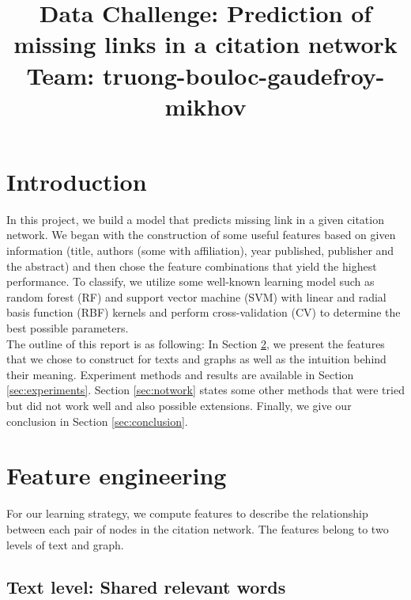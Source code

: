 \documentclass{article}
\title{Data Challenge: Prediction of missing links in a citation network\\Team: truong-bouloc-gaudefroy-mikhov}
\begin{document}
\ninept

\maketitle


\section{Introduction}

In this project, we build a model that predicts missing link in a given citation network. We began with the construction of some useful features based on given information (title, authors (some with affiliation), year published, publisher and the abstract) and then chose the feature combinations that yield the highest performance. To classify, we utilize some well-known learning model such as random forest (RF) and support vector machine (SVM) with linear and radial basis function (RBF) kernels and perform cross-validation (CV) to determine the best possible parameters.\\
The outline of this report is as following: In Section \ref{sec:feature}, we present the features that we chose to construct for texts and graphs as well as the intuition behind their meaning. Experiment methods and results are available in Section \ref{sec:experiments}. Section \ref{sec:notwork} states some other methods that were tried but did not work well and also possible extensions. Finally, we give our conclusion in Section \ref{sec:conclusion}.

\section{Feature engineering}
\label{sec:feature}

For our learning strategy, we compute features to describe the relationship between each pair of nodes in the citation network. The features belong to two levels of text and graph.

\subsection{Text level: Shared relevant words}
\end{document}
